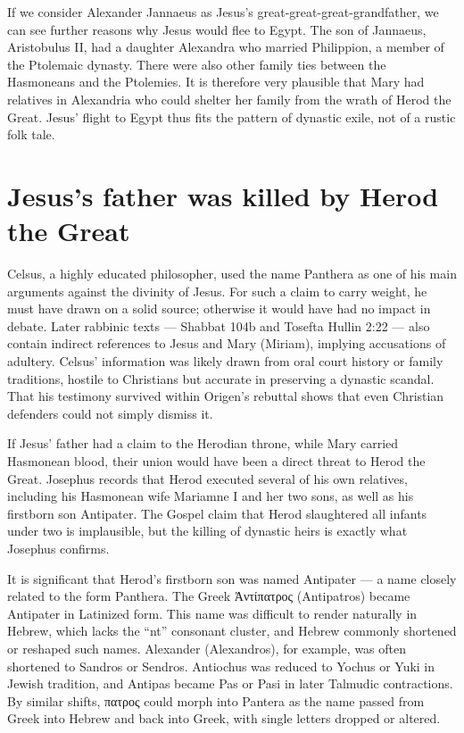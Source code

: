 If we consider Alexander Jannaeus as Jesus’s great-great-great-grandfather, we can see further reasons why Jesus would flee to Egypt.
The son of Jannaeus, Aristobulus II, had a daughter Alexandra who married Philippion, a member of the Ptolemaic dynasty.
There were also other family ties between the Hasmoneans and the Ptolemies.
It is therefore very plausible that Mary had relatives in Alexandria who could shelter her family from the wrath of Herod the Great.
Jesus’ flight to Egypt thus fits the pattern of dynastic exile, not of a rustic folk tale.

\section{Jesus's father was killed by Herod the Great}\label{par:jesuss-father-was-killed-by-herod-the-great}

Celsus, a highly educated philosopher, used the name Panthera as one of his main arguments against the divinity of Jesus.
For such a claim to carry weight, he must have drawn on a solid source; otherwise it would have had no impact in debate.
Later rabbinic texts — Shabbat 104b and Tosefta Hullin 2:22 — also contain indirect references to Jesus and Mary (Miriam), implying accusations of adultery.
Celsus’ information was likely drawn from oral court history or family traditions, hostile to Christians but accurate in preserving a dynastic scandal.
That his testimony survived within Origen’s rebuttal shows that even Christian defenders could not simply dismiss it.

If Jesus’ father had a claim to the Herodian throne, while Mary carried Hasmonean blood, their union would have been a direct threat to Herod the Great.
Josephus records that Herod executed several of his own relatives, including his Hasmonean wife Mariamne I and her two sons, as well as his firstborn son Antipater.
The Gospel claim that Herod slaughtered all infants under two is implausible, but the killing of dynastic heirs is exactly what Josephus confirms.

It is significant that Herod’s firstborn son was named Antipater — a name closely related to the form Panthera.
The Greek Ἀντίπατρος (Antipatros) became Antipater in Latinized form.
This name was difficult to render naturally in Hebrew, which lacks the “nt” consonant cluster, and Hebrew commonly shortened or reshaped such names.
Alexander (Alexandros), for example, was often shortened to Sandros or Sendros.
Antiochus was reduced to Yochus or Yuki in Jewish tradition, and Antipas became Pas or Pasi in later Talmudic contractions.
By similar shifts, πατρος could morph into Pantera as the name passed from Greek into Hebrew and back into Greek, with single letters dropped or altered.

